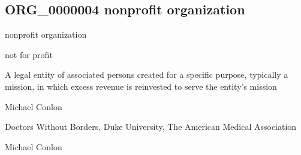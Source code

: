 \documentclass[letterpaper,10pt,english]{sphinxmanual}
\begin{document}
\subsection{ORG\_0000004 \sphinxhyphen{} nonprofit organization}
\label{\detokenize{doc-ORG_0000004:org-0000004-nonprofit-organization}}\label{\detokenize{doc-ORG_0000004:index-0}}\label{\detokenize{doc-ORG_0000004::doc}}
\begin{sphinxShadowBox}

\sphinxAtStartPar
nonprofit organization
\end{sphinxShadowBox}

\begin{sphinxShadowBox}

\sphinxAtStartPar
not for profit
\end{sphinxShadowBox}

\begin{sphinxShadowBox}

\sphinxAtStartPar
{\hyperref[\detokenize{doc-ORG_0000001::doc}]{}}
\end{sphinxShadowBox}

\begin{sphinxShadowBox}

\sphinxAtStartPar
A legal entity of associated persons created for a specific purpose, typically a mission, in which excess revenue is reinvested to serve the entity’s mission
\end{sphinxShadowBox}

\begin{sphinxShadowBox}

\sphinxAtStartPar
Michael Conlon 
\end{sphinxShadowBox}

\begin{sphinxShadowBox}

\sphinxAtStartPar
Doctors Without Borders, Duke University, The American Medical Association
\end{sphinxShadowBox}

\begin{sphinxShadowBox}

\sphinxAtStartPar
Michael Conlon 
\end{sphinxShadowBox}
\begin{quote}

\ignorespaces \end{quote}
\end{document}
